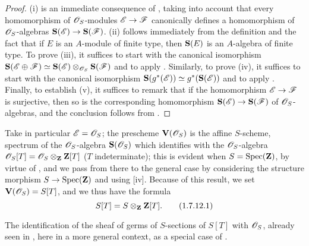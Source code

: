 \begin{proof}
(i) is an immediate consequence of , taking into account that every homomorphism of $\mathscr{O}_S$-modules $\sh{E}\to\sh{F}$ canonically defines a homomorphism of $\mathscr{O}_S$-algebras $\bb{S}(\sh{E})\to\bb{S}(\sh{F})$.
(ii) follows immediately from the definition  and the fact that if $E$ is an $A$-module of finite type, then $\mathbf{S}(E)$ is an $A$-algebra of finite type.
To prove (iii), it suffices to start with the canonical isomorphism $\mathbf{S}(\mathscr{E}\oplus\mathscr{F})\simeq\mathbf{S}(\mathscr{E})\otimes_{\mathscr{O}_S}\mathbf{S}(\mathscr{F})$  and to apply .
Similarly, to prove (iv), it suffices to start with the canonical isomorphism $\mathbf{S}(g^*(\mathscr{E}))\simeq g^*(\mathbf{S}(\mathscr{E}))$  and to apply .
Finally, to establish (v), it suffices to remark that if the homomorphism $\sh{E}\to\sh{F}$ is surjective, then so is the corresponding homomorphism $\bb{S}(\sh{E})\to\bb{S}(\sh{F})$ of $\mathscr{O}_S$-algebras, and the conclusion follows from .
\end{proof}

\begin{env}[1.7.12]
\label{II.1.7.12}
Take in particular $\mathscr{E}=\mathscr{O}_S$; the prescheme $\mathbf{V}(\mathscr{O}_S)$ is the affine $S$-scheme, spectrum of the $\mathscr{O}_S$-algebra $\mathbf{S}(\mathscr{O}_S)$ which identifies with the $\mathscr{O}_S$-algebra $\mathscr{O}_S[T]=\mathscr{O}_S\otimes_\mathbf{Z}\mathbf{Z}[T]$
($T$ indeterminate); this is evident when $S=\operatorname{Spec}(\mathbf{Z})$, by virtue of , and we pass from there to the general case by considering the structure morphism $S\to\Spec(\bb{Z})$ and using [iv].
Because of this result, we set $\mathbf{V}(\mathscr{O}_S)=S[T]$, and we thus have the formula
\[
\label{II.1.7.12.1}
  S[T]=S\otimes_\mathbf{Z}\mathbf{Z}[T].
  \tag{1.7.12.1}
\]

The identification of the sheaf of germs of $S$-sections of $S[T]$ with $\mathscr{O}_S$, already seen in , here in a more general context, as a special case of .
\end{env}

